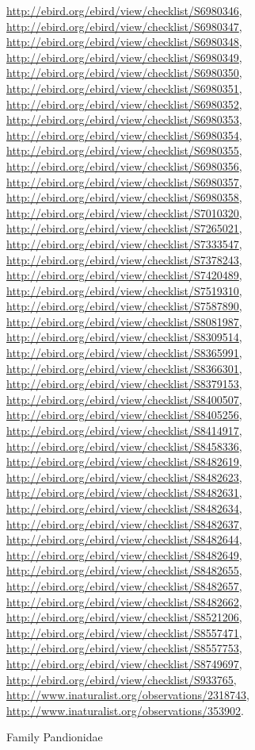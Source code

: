 \documentclass[9pt, article]{memoir}
\begin{document}
\begin{multicols}{2}
\url{http://ebird.org/ebird/view/checklist/S6980346}, 
\url{http://ebird.org/ebird/view/checklist/S6980347}, 
\url{http://ebird.org/ebird/view/checklist/S6980348}, 
\url{http://ebird.org/ebird/view/checklist/S6980349}, 
\url{http://ebird.org/ebird/view/checklist/S6980350}, 
\url{http://ebird.org/ebird/view/checklist/S6980351}, 
\url{http://ebird.org/ebird/view/checklist/S6980352}, 
\url{http://ebird.org/ebird/view/checklist/S6980353}, 
\url{http://ebird.org/ebird/view/checklist/S6980354}, 
\url{http://ebird.org/ebird/view/checklist/S6980355}, 
\url{http://ebird.org/ebird/view/checklist/S6980356}, 
\url{http://ebird.org/ebird/view/checklist/S6980357}, 
\url{http://ebird.org/ebird/view/checklist/S6980358}, 
\url{http://ebird.org/ebird/view/checklist/S7010320}, 
\url{http://ebird.org/ebird/view/checklist/S7265021}, 
\url{http://ebird.org/ebird/view/checklist/S7333547}, 
\url{http://ebird.org/ebird/view/checklist/S7378243}, 
\url{http://ebird.org/ebird/view/checklist/S7420489}, 
\url{http://ebird.org/ebird/view/checklist/S7519310}, 
\url{http://ebird.org/ebird/view/checklist/S7587890}, 
\url{http://ebird.org/ebird/view/checklist/S8081987}, 
\url{http://ebird.org/ebird/view/checklist/S8309514}, 
\url{http://ebird.org/ebird/view/checklist/S8365991}, 
\url{http://ebird.org/ebird/view/checklist/S8366301}, 
\url{http://ebird.org/ebird/view/checklist/S8379153}, 
\url{http://ebird.org/ebird/view/checklist/S8400507}, 
\url{http://ebird.org/ebird/view/checklist/S8405256}, 
\url{http://ebird.org/ebird/view/checklist/S8414917}, 
\url{http://ebird.org/ebird/view/checklist/S8458336}, 
\url{http://ebird.org/ebird/view/checklist/S8482619}, 
\url{http://ebird.org/ebird/view/checklist/S8482623}, 
\url{http://ebird.org/ebird/view/checklist/S8482631}, 
\url{http://ebird.org/ebird/view/checklist/S8482634}, 
\url{http://ebird.org/ebird/view/checklist/S8482637}, 
\url{http://ebird.org/ebird/view/checklist/S8482644}, 
\url{http://ebird.org/ebird/view/checklist/S8482649}, 
\url{http://ebird.org/ebird/view/checklist/S8482655}, 
\url{http://ebird.org/ebird/view/checklist/S8482657}, 
\url{http://ebird.org/ebird/view/checklist/S8482662}, 
\url{http://ebird.org/ebird/view/checklist/S8521206}, 
\url{http://ebird.org/ebird/view/checklist/S8557471}, 
\url{http://ebird.org/ebird/view/checklist/S8557753}, 
\url{http://ebird.org/ebird/view/checklist/S8749697}, 
\url{http://ebird.org/ebird/view/checklist/S933765}, 
\url{http://www.inaturalist.org/observations/2318743}, 
\url{http://www.inaturalist.org/observations/353902}.

\vspace{6pt}\noindent\hspace{24pt}Family Pandionidae



\end{multicols}
\end{document}
